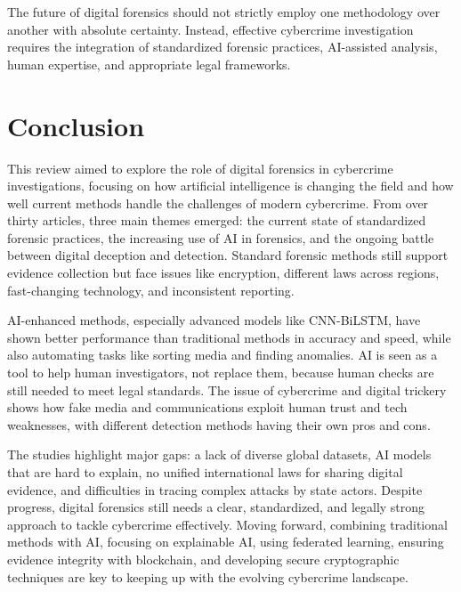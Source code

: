 \documentclass[12pt,a4paper]{article}
\begin{document}
The future of digital forensics should not strictly employ one methodology over another with absolute certainty. Instead, effective cybercrime investigation requires the integration of standardized forensic practices, AI-assisted analysis, human expertise, and appropriate legal frameworks. 
\newpage
\section{Conclusion}

This review aimed to explore the role of digital forensics in cybercrime investigations, focusing on how artificial intelligence is changing the field and how well current methods handle the challenges of modern cybercrime. From over thirty articles, three main themes emerged: the current state of standardized forensic practices, the increasing use of AI in forensics, and the ongoing battle between digital deception and detection. Standard forensic methods still support evidence collection but face issues like encryption, different laws across regions, fast-changing technology, and inconsistent reporting.

AI-enhanced methods, especially advanced models like CNN-BiLSTM, have shown better performance than traditional methods in accuracy and speed, while also automating tasks like sorting media and finding anomalies. AI is seen as a tool to help human investigators, not replace them, because human checks are still needed to meet legal standards. The issue of cybercrime and digital trickery shows how fake media and communications exploit human trust and tech weaknesses, with different detection methods having their own pros and cons.

The studies highlight major gaps: a lack of diverse global datasets, AI models that are hard to explain, no unified international laws for sharing digital evidence, and difficulties in tracing complex attacks by state actors. Despite progress, digital forensics still needs a clear, standardized, and legally strong approach to tackle cybercrime effectively. Moving forward, combining traditional methods with AI, focusing on explainable AI, using federated learning, ensuring evidence integrity with blockchain, and developing secure cryptographic techniques are key to keeping up with the evolving cybercrime landscape.
\end{document}
